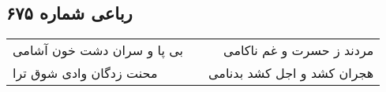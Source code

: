 \begin{center}
\section*{رباعی شماره ۶۷۵}
\label{sec:sh675}
\begin{longtable}{l p{0.5cm} r}
بی پا و سران دشت خون آشامی
&&
مردند ز حسرت و غم ناکامی
\\
محنت زدگان وادی شوق ترا
&&
هجران کشد و اجل کشد بدنامی
\\
\end{longtable}
\end{center}
